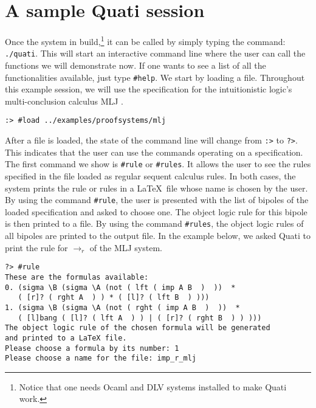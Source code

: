 \documentclass{llncs}
\begin{document}
\section{A sample Quati session}

Once the system in build,\footnote{Notice that one needs Ocaml and DLV systems installed to make
Quati work.} it can be called by simply typing the command:
\texttt{./quati}. This will start an interactive command line where the user can
call the functions we will demonstrate now. If one wants to see a list of all
the functionalities available, just type \texttt{\#help}. We start by loading a
file. Throughout this example session, we will use the specification for the
intuitionistic logic's multi-conclusion calculus MLJ \cite{maehara54nmj}.
%
\vspace{-1mm}

{\small
\begin{verbatim}
:> #load ../examples/proofsystems/mlj
\end{verbatim}
}

After a file is loaded, the state of the command line will change from
\texttt{:>} to \texttt{?>}. This indicates that the user can use the commands
operating on a specification. The first command we show is \texttt{\#rule} or
\texttt{\#rules}. It allows the user to see the rules specified in the file
loaded as regular sequent calculus rules. In both cases, the system prints the
rule or rules in a \LaTeX\ file whose name is chosen by the user. By using the
command \texttt{\#rule}, the user is presented with the list of bipoles of the
loaded specification and asked to choose one. The object logic rule for this
bipole is then printed to a file. By using the command \texttt{\#rules}, the
object logic rules of all bipoles are printed to the output file. In the example
below, we asked Quati to print the rule for $\rightarrow_r$ of the MLJ system.
\vspace{-1mm}

{\small
\begin{verbatim}
?> #rule
These are the formulas available: 
0. (sigma \B (sigma \A (not ( lft ( imp A B  )  ))  * 
   ( [r]? ( rght A  ) ) * ( [l]? ( lft B  ) )))
1. (sigma \B (sigma \A (not ( rght ( imp A B  )  ))  * 
   ( [l]bang ( [l]? ( lft A  ) ) | ( [r]? ( rght B  ) ) )))
The object logic rule of the chosen formula will be generated 
and printed to a LaTeX file.
Please choose a formula by its number: 1
Please choose a name for the file: imp_r_mlj
\end{verbatim}
}
\end{document}
